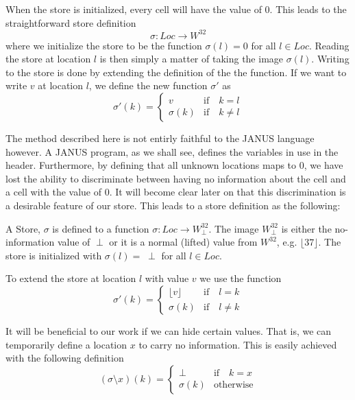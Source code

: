 When the store is initialized, every cell will have the value of
$0$. This leads to the straightforward store definition
\begin{equation*}
  \sigma \colon Loc \to W^{32}
\end{equation*}
where we initialize the store to be the function $\sigma(l) = 0$ for
all $l \in Loc$. Reading the store at location $l$ is then simply a
matter of taking the image $\sigma(l)$. Writing to the store is done
by extending the definition of the the function. If we want to write
$v$ at location $l$, we define the new function $\sigma'$ as
\begin{equation*}
  \sigma'(k) = \begin{cases}
    v& \text{if}\quad k = l\\
    \sigma(k)&\text{if}\quad k \neq l
    \end{cases}
\end{equation*}

The method described here is not entirly faithful to the JANUS
language however. A JANUS program, as we shall see, defines the
variables in use in the header. Furthermore, by defining that all
unknown locations maps to $0$, we have lost the ability to
discriminate between having no information about the cell and a cell
with the value of $0$. It will become clear later on that this
discrimination is a desirable feature of our store. This leads to a
store definition as the following:
\newcommand{\lift}[1]{\lfloor #1 \rfloor}
\begin{defn}
  A Store, $\sigma$ is defined to a function $\sigma \colon Loc \to
  W^{32}_\perp$. The image $W^{32}_\perp$ is either the no-information
  value of $\perp$ or it is a normal (lifted) value from $W^{32}$,
  e.g. $\lift{37}$. The store is initialized with $\sigma(l) = \;\perp$
  for all $l \in Loc$.

  To extend the store at location $l$ with value $v$ we use the
  function
  \begin{equation*}
    \sigma'(k) = \begin{cases}
      \lift{v}& \text{if}\quad l = k\\
      \sigma(k)& \text{if}\quad l \neq k
      \end{cases}
  \end{equation*}
\end{defn}
It will be beneficial to our work if we can hide certain values. That
is, we can temporarily define a location $x$ to carry no
information. This is easily achieved with the following definition
\begin{equation*}
  (\sigma \setminus x)(k) = \begin{cases}
    \perp& \text{if}\quad k = x\\
    \sigma(k)& \text{otherwise}
  \end{cases}
\end{equation*}

